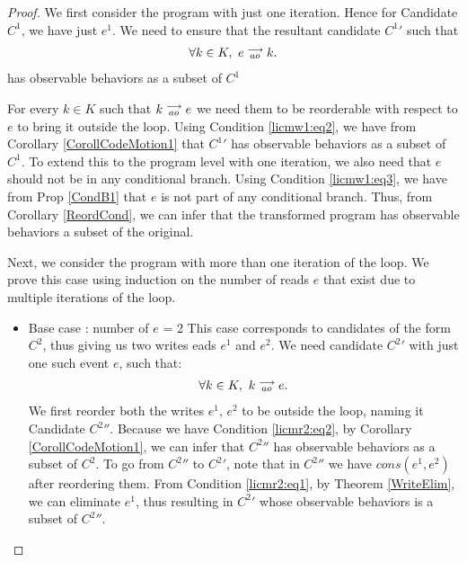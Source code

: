 \begin{proof}


    We first consider the program with just one iteration. Hence for Candidate $C^1$, we have just $e^1$. 
    We need to ensure that the resultant candidate $C^{1}'$ such that 
    \begin{align*}
        \forall k \in K, \ e\stackrel{\longrightarrow}{_{ao}}k.
    \end{align*}  
    has observable behaviors as a subset of $C^1$

    For every $k \in K$ such that $k\stackrel{\longrightarrow}{_{ao}}e$ we need them to be reorderable with respect to $e$ to bring it outside the loop.
    Using Condition \ref{licmw1:eq2}, we have from Corollary \ref{CorollCodeMotion1} that $C^{1}'$ has observable behaviors as a subset of $C^1$.
    To extend this to the program level with one iteration, we also need that $e$ should not be in any conditional branch.
    Using Condition \ref{licmw1:eq3}, we have from Prop \ref{CondB1} that $e$ is not part of any conditional branch.
    Thus, from Corollary \ref{ReordCond}, we can infer that the transformed program has observable behaviors a subset of the original.  
    
    Next, we consider the program with more than one iteration of the loop. 
    We prove this case using induction on the number of reads $e$ that exist due to multiple iterations of the loop. 
    \begin{itemize}

        \item Base case : number of $e$ = 2
        This case corresponds to candidates of the form $C^2$, thus giving us two writes eads $e^1$ and $e^2$.
        We need candidate $C^{2}'$ with just one such event $e$, such that:
        \begin{align*}
            \forall k \in K, \ k\stackrel{\longrightarrow}{_{ao}}e.
        \end{align*}  
        We first reorder both the writes $e^1$, $e^2$ to be outside the loop, naming it Candidate $C^{2}''$.
        Because we have Condition \ref{licmr2:eq2}, by Corollary \ref{CorollCodeMotion1}, we can infer that $C^{2}''$ has observable behaviors as a subset of $C^2$.
        To go from $C^{2}''$ to $C^{2}'$, note that in $C^{2}''$ we have $cons(e^1, e^2)$ after reordering them. 
        From Condition \ref{licmr2:eq1}, by Theorem \ref{WriteElim}, we can eliminate $e^1$, thus resulting in $C^{2}'$ whose observable behaviors is a subset of $C^{2}''$\footnotemark.

        

\end{itemize}
\end{proof}
